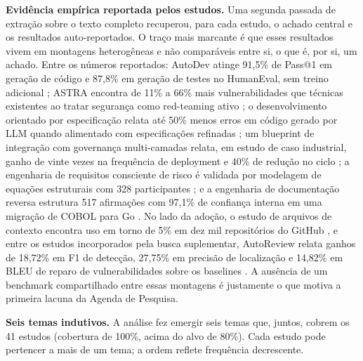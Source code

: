 \noindent\textbf{Evidência empírica reportada pelos estudos.} Uma segunda passada de extração sobre o texto completo recuperou, para cada estudo, o achado central e os resultados auto-reportados. O traço mais marcante é que esses resultados vivem em montagens heterogêneas e não comparáveis entre si, o que é, por si, um achado. Entre os números reportados: AutoDev atinge 91,5\% de Pass@1 em geração de código e 87,8\% em geração de testes no HumanEval, sem treino adicional \cite{MicheleTufano2024}; ASTRA encontra de 11\% a 66\% mais vulnerabilidades que técnicas existentes ao tratar segurança como red-teaming ativo \cite{XiangzheXu2025}; o desenvolvimento orientado por especificação relata até 50\% menos erros em código gerado por LLM quando alimentado com especificações refinadas \cite{DeepakBabuPiskala2026}; um blueprint de integração com governança multi-camadas relata, em estudo de caso industrial, ganho de vinte vezes na frequência de deployment e 40\% de redução no ciclo \cite{SKaruppuchamy2026}; a engenharia de requisitos consciente de risco é validada por modelagem de equações estruturais com 328 participantes \cite{Watfa2026}; e a engenharia de documentação reversa estrutura 517 afirmações com 97,1\% de confiança interna em uma migração de COBOL para Go \cite{Macedo2026}. No lado da adoção, o estudo de arquivos de contexto encontra uso em torno de 5\% em dez mil repositórios do GitHub \cite{SeyedmoeinMohsenimofidi2025}, e entre os estudos incorporados pela busca suplementar, AutoReview relata ganhos de 18,72\% em F1 de detecção, 27,75\% em precisão de localização e 14,82\% em BLEU de reparo de vulnerabilidades sobre os baselines \cite{Chen2025}. A ausência de um benchmark compartilhado entre essas montagens é justamente o que motiva a primeira lacuna da Agenda de Pesquisa.

\noindent\textbf{Seis temas indutivos.} A análise fez emergir seis temas que, juntos, cobrem os 41 estudos (cobertura de 100\%, acima do alvo de 80\%). Cada estudo pode pertencer a mais de um tema; a ordem reflete frequência decrescente.

